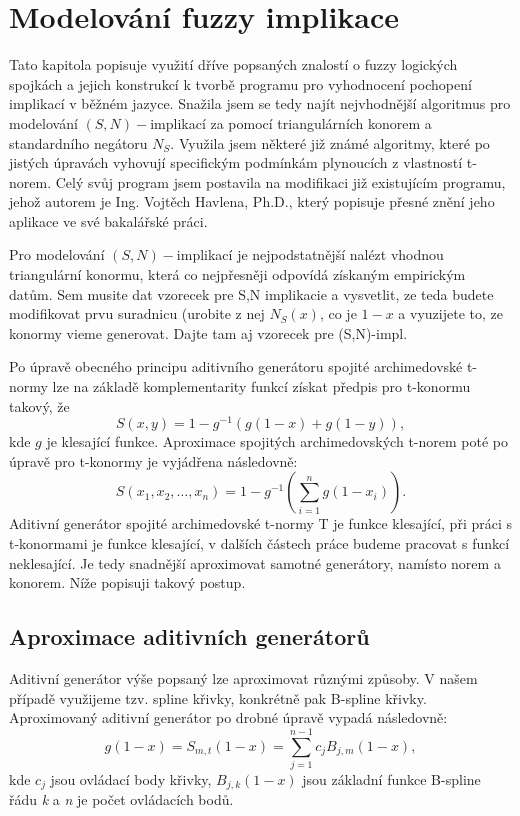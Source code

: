 \section{Modelování fuzzy implikace}
Tato kapitola popisuje využití dříve popsaných znalostí o fuzzy logických spojkách a jejich konstrukcí k tvorbě programu pro vyhodnocení pochopení implikací v běžném jazyce. Snažila jsem se tedy najít nejvhodnější algoritmus pro modelování $(S,N)-$implikací za pomocí triangulárních konorem a standardního negátoru  $N_S$. Využila jsem některé již známé algoritmy, které po jistých \' upravách vyhovují specifickým podmínkám plynoucích z vlastností t-norem. Celý sv\r uj program jsem postavila na  modifikaci již existujícím programu, jehož autorem je Ing. Vojtěch Havlena, Ph.D., který popisuje přesné znění jeho aplikace ve své bakalářské práci. \cite{havlena}

Pro modelování $(S,N)-$implikací je nejpodstatnější nalézt vhodnou triangulární konormu, která co nejpřesněji odpovídá získaným empirickým dat\r um.
{\color{red} Sem musite dat vzorecek pre S,N implikacie a vysvetlit, ze teda budete modifikovat prvu suradnicu (urobite z nej $N_S(x)$, co je $1-x$ a vyuzijete to, ze konormy vieme generovat. Dajte tam aj vzorecek pre (S,N)-impl.}

Po \' upravě obecného principu aditivního generátoru spojité archimedovské t-normy \cite{alsina} lze na základě komplementarity funkcí získat předpis pro t-konormu takový, že $$S(x,y) = 1 - g^{-1}(g(1-x) + g(1-y)),$$ kde $g$ je klesající funkce. Aproximace spojitých archimedovských t-norem poté po \' upravě pro t-konormy je vyjádřena následovně: \cite{Beliakov} $$S(x_1, x_2, \dots, x_n) = 1 - g^{-1}\left(\sum_{i = 1}^{n} g(1 - x_i)\right).$$
Aditivní generátor spojité archimedovské t-normy T je funkce klesající, při práci s t-konormami je funkce klesající, v dalších částech práce budeme pracovat s funkcí neklesající. Je tedy snadnější aproximovat samotné generátory, namísto norem a konorem. Níže popisuji takový postup.

\subsection{Aproximace aditivních generátor\r u}
Aditivní generátor výše popsaný lze aproximovat r\r uznými zp\r usoby. V našem případě využijeme tzv. spline křivky, konkrétně pak B-spline křivky. Aproximovaný aditivní generátor po drobné \' upravě vypadá následovně: \cite{Beliakov} $$g(1-x) = S_{m,t}(1-x) = \sum_{j = 1}^{n-1}c_jB_{j,m}(1-x),$$ kde \textit{$c_j$} jsou ovládací body křivky, \textit{$B_{j,k}(1-x)$} jsou základní funkce B-spline řádu \textit{k} a \textit{n} je počet ovládacích bod\r u.

